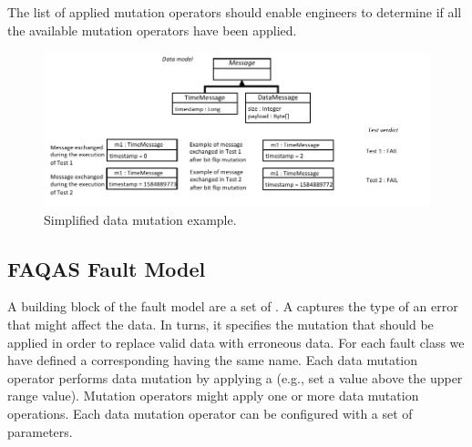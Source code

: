 The list of applied mutation operators should enable engineers to determine if all the available mutation operators have been applied.


\begin{figure}[t!]
  \centering
    \includegraphics{images/DataDrivenSimpleExample}
      \caption{Simplified data mutation example.}
      \label{fig:DataDrivenSimpleExample}
\end{figure}

\clearpage



\clearpage
\subsection{FAQAS Fault Model}
\label{sec:dataModel}
\label{sec:faultModel}





A building block of the fault model are a set of .
A   captures the type of an error that might affect the data. In turns, it specifies the mutation that should be applied in order to replace valid data with erroneous data. For each fault class we have defined a corresponding  having the same name. 
Each {data mutation operator} performs data mutation by applying a  (e.g., set a value above the upper range value). Mutation operators might apply one or more data mutation operations.
Each data mutation operator can be configured with a set of parameters. 

